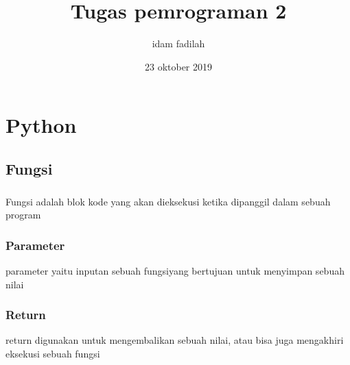 \documentclass[a4paper,12pt]{report}
\title{Tugas pemrograman 2}
\author{idam fadilah}
\date{23 oktober 2019}
\begin{document}
\maketitle
\chapter{Python}
\section{Fungsi}
\paragraph{}
Fungsi adalah blok kode yang akan dieksekusi ketika dipanggil dalam sebuah program
\subsection*{Parameter}
parameter yaitu inputan sebuah fungsiyang bertujuan untuk menyimpan sebuah nilai
\subsection*{Return}
return digunakan untuk mengembalikan sebuah nilai, atau bisa juga mengakhiri eksekusi sebuah fungsi
\end{document}
